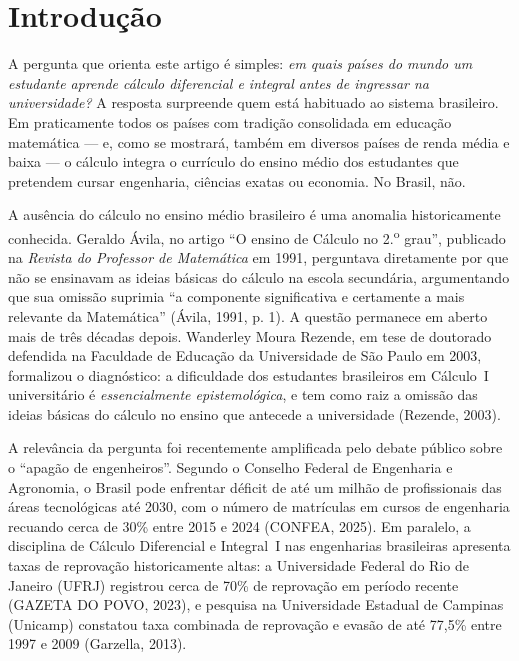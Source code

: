 \documentclass[12pt,a4paper,oneside]{article}
\begin{document}
\smallskip
{}

\bigskip

\section{Introdução}

A pergunta que orienta este artigo é simples: \emph{em quais países do
mundo um estudante aprende cálculo diferencial e integral antes de
ingressar na universidade?} A resposta surpreende quem está habituado ao
sistema brasileiro. Em praticamente todos os países com tradição
consolidada em educação matemática --- e, como se mostrará, também em
diversos países de renda média e baixa --- o cálculo integra o currículo
do ensino médio dos estudantes que pretendem cursar engenharia, ciências
exatas ou economia. No Brasil, não.

A ausência do cálculo no ensino médio brasileiro é uma anomalia
historicamente conhecida. Geraldo Ávila, no artigo ``O ensino de Cálculo
no 2.\textsuperscript{o} grau'', publicado na \emph{Revista do Professor
de Matemática} em 1991, perguntava diretamente por que não se ensinavam
as ideias básicas do cálculo na escola secundária, argumentando que sua
omissão suprimia ``a componente significativa e certamente a mais
relevante da Matemática'' (Ávila, 1991, p. 1). A questão permanece em
aberto mais de três décadas depois. Wanderley Moura Rezende, em tese de
doutorado defendida na Faculdade de Educação da Universidade de São Paulo
em 2003, formalizou o diagnóstico: a dificuldade dos estudantes
brasileiros em Cálculo~I universitário é \emph{essencialmente
epistemológica}, e tem como raiz a omissão das ideias básicas do cálculo
no ensino que antecede a universidade (Rezende, 2003).

A relevância da pergunta foi recentemente amplificada pelo debate público
sobre o ``apagão de engenheiros''. Segundo o Conselho Federal de
Engenharia e Agronomia, o Brasil pode enfrentar déficit de até um milhão
de profissionais das áreas tecnológicas até 2030, com o número de
matrículas em cursos de engenharia recuando cerca de 30\% entre 2015 e
2024 (CONFEA, 2025). Em paralelo, a disciplina de Cálculo Diferencial e
Integral~I nas engenharias brasileiras apresenta taxas de reprovação
historicamente altas: a Universidade Federal do Rio de Janeiro (UFRJ)
registrou cerca de 70\% de reprovação em período recente (GAZETA DO POVO,
2023), e pesquisa na Universidade Estadual de Campinas (Unicamp)
constatou taxa combinada de reprovação e evasão de até 77,5\% entre 1997
e 2009 (Garzella, 2013).
\end{document}
